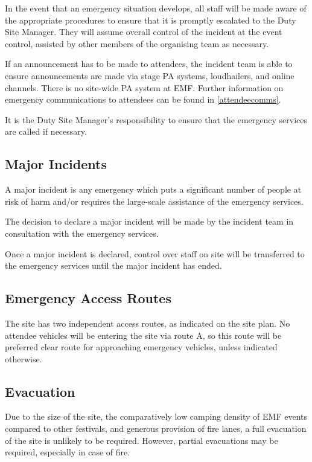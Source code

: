 In the event that an emergency situation develops, all staff will be made aware of
the appropriate procedures to ensure that it is promptly escalated to the Duty Site Manager.
They will assume overall control of the incident at the event control, assisted by other
members of the organising team as necessary.

If an announcement has to be made to attendees, the incident team is able to
ensure announcements are made via stage PA systems, loudhailers, and online channels.
There is no site-wide PA system at EMF\@. Further information on emergency communications
to attendees can be found in \cref{attendeecomms}.

It is the Duty Site Manager's responsibility to ensure that the emergency services
are called if necessary.

\subsection{Major Incidents}
A major incident is any emergency which puts a significant number of people at risk
of harm and/or requires the large-scale assistance of the emergency services.

The decision to declare a major incident will be made by the incident team in
consultation with the emergency services.

Once a major incident is declared, control over staff on site will be transferred
to the emergency services until the major incident has ended.

\subsection{Emergency Access Routes}\label{emergencyaccess}
The site has two independent access routes, as indicated on the site plan. No
attendee vehicles will be entering the site via route A, so this route will be
preferred clear route for approaching emergency vehicles, unless indicated
otherwise.

\subsection{Evacuation}\label{evacuation}
Due to the size of the site, the comparatively low camping density of EMF events
compared to other festivals, and generous provision of fire lanes, a full evacuation
of the site is unlikely to be required. However, partial evacuations may be required,
especially in case of fire.

